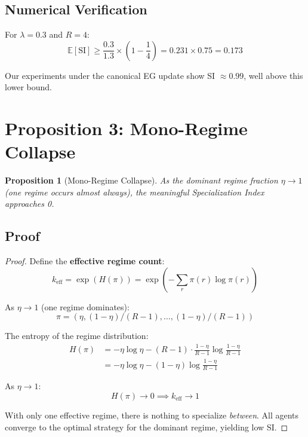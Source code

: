 \documentclass[11pt,a4paper]{article}
\theoremstyle{definition}
\theoremstyle{plain}
\newtheorem{proposition}{Proposition}[section]
\newcommand{\E}{\mathbb{E}}
\newcommand{\SI}{\text{SI}}
\begin{document}
\subsection{Numerical Verification}

For $\lambda = 0.3$ and $R = 4$:
\begin{equation}
\E[\SI] \geq \frac{0.3}{1.3} \times \left(1 - \frac{1}{4}\right) = 0.231 \times 0.75 = 0.173
\end{equation}

Our experiments under the canonical EG update show SI $\approx 0.99$, well above this lower bound.

\section{Proposition 3: Mono-Regime Collapse}

\begin{proposition}[Mono-Regime Collapse]
\label{prop:mono-regime}
As the dominant regime fraction $\eta \to 1$ (one regime occurs almost always), the meaningful Specialization Index approaches 0.
\end{proposition}

\subsection{Proof}

\begin{proof}
Define the \textbf{effective regime count}:
\begin{equation}
k_{\text{eff}} = \exp(H(\pi)) = \exp\left(-\sum_r \pi(r) \log \pi(r)\right)
\end{equation}

As $\eta \to 1$ (one regime dominates):
\begin{equation}
\pi = (\eta, (1-\eta)/(R-1), \ldots, (1-\eta)/(R-1))
\end{equation}

The entropy of the regime distribution:
\begin{align}
H(\pi) &= -\eta \log \eta - (R-1) \cdot \frac{1-\eta}{R-1} \log \frac{1-\eta}{R-1} \\
&= -\eta \log \eta - (1-\eta) \log \frac{1-\eta}{R-1}
\end{align}

As $\eta \to 1$:
\begin{equation}
H(\pi) \to 0 \implies k_{\text{eff}} \to 1
\end{equation}

With only one effective regime, there is nothing to specialize \textit{between}. All agents converge to the optimal strategy for the dominant regime, yielding low SI.
\end{proof}
\end{document}
